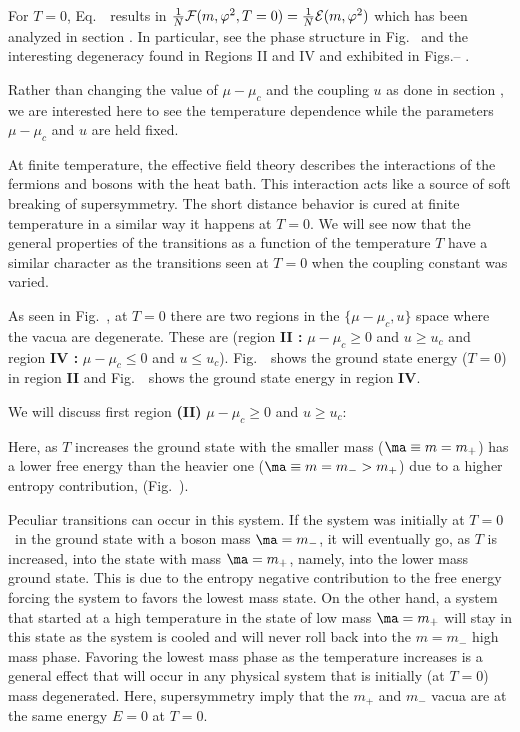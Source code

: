  For $T=0$, Eq.~\eWvar\  results in
$ {1\over N}{\cal F}(m,\varphi^2, T=0) ={1\over N}{\cal
E}(m,\varphi^2)$ which has been analyzed in section \ssNSUSYsc. In
particular, see the phase structure in Fig.\phases~ and the
interesting degeneracy found in Regions II and IV and exhibited in
Figs.\ZeroTone-- \ZeroTtwo.

Rather than changing the value of $\mu-\mu_c$ and the coupling $u$
as done in section \ssNSUSYsc, we are interested here to see
the temperature dependence while the parameters $\mu-\mu_c$ and
$u$ are held fixed.

At finite temperature, the effective field theory describes  the
interactions of the fermions and bosons with the heat bath. This
interaction acts like a source of soft breaking of supersymmetry.
The short distance behavior is cured at finite temperature in a
similar way it happens at $T=0$. We will see now that the general
properties of the transitions as a function of the temperature $T$
have a similar character as the transitions seen at $T=0$ when the
coupling constant was varied.


As seen in Fig.~\phases, at $T=0$ there are two regions in the $\{
\mu-\mu_c , u \}$ space where the vacua are degenerate.
These are (region {\bf II :}
$\mu-\mu_c \geq 0$ and $u \geq u_c$ and region {\bf IV : }
$\mu-\mu_c \leq 0$ and $u \leq u_c$). Fig.~\figTIIaaa ~shows the
ground state  energy ($T=0$) in region {\bf II} and Fig.~\figTIVaa ~shows the  ground state energy  in region
{\bf IV}.



We will discuss first region {\bf (II)}  $\mu-\mu_c \geq 0$
and $u \geq u_c$:

\noindent Here, as $T$ increases the ground state with the smaller
mass ($\ma\equiv m =m_+$) has a lower free energy than the heavier
one ($\ma \equiv m=m_- > m_+$) due to a higher entropy
contribution,
(Fig.~\label{\figTIIa}).


Peculiar transitions can occur in this system. If the system was
initially at $T=0$ ~in the ground state with a boson mass
$\ma=m_-$, it will eventually go, as $T$ is increased, into the
state with mass $\ma=m_+$, namely, into the lower mass ground
state. This is due to the entropy negative contribution to the
free energy forcing the system to favors the lowest mass state. On
the other hand, a system that started at a high temperature in the
state of low mass $\ma=m_+$ will stay in this state as the system
is cooled and will never roll back into the $m=m_-$ high mass
phase. Favoring the lowest  mass phase as the temperature
increases is a general effect that will occur in any physical
system that is initially (at $T=0$) mass degenerated. Here,
supersymmetry imply that the $m_+$ and $m_-$ vacua are at the same
energy $E=0$ at $T=0$.

